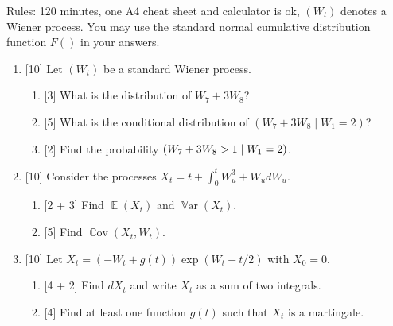 \documentclass[12pt]{article}
\DeclareMathOperator{\Cov}{\mathbb{C}ov}
\DeclareMathOperator{\Var}{\mathbb{V}ar}
\let\P\relax
\DeclareMathOperator{\P}{\mathbb{P}}
\DeclareMathOperator{\E}{\mathbb{E}}
\begin{document}
Rules: 120 minutes, one A4 cheat sheet and calculator is ok, $(W_t)$ denotes a Wiener process.
You may use the standard normal cumulative distribution function $F()$ in your answers.

\begin{enumerate}
    \item {[10]} Let $(W_t)$ be a standard Wiener process. 
    \begin{enumerate}
        \item {[3]} What is the distribution of $W_7 + 3W_8$? 
        \item {[5]} What is the conditional distribution of $(W_7 + 3W_8 \mid W_1 = 2)$?
        \item {[2]} Find the probability $\P(W_7 + 3W_8 > 1 \mid W_1 = 2)$.
    \end{enumerate}


    \item {[10]} Consider the processes $X_t = t + \int_0^t W_u^3 + W_u dW_u$.
    \begin{enumerate}
        \item {[2 + 3]} Find $\E(X_t)$ and $\Var(X_t)$.
        \item {[5]} Find $\Cov(X_t, W_t)$.
    \end{enumerate}




    \item {[10]} Let $X_t = (- W_t + g(t))\exp(W_t - t/2)$ with $X_0 = 0$.
    \begin{enumerate}
        \item {[4 + 2]} Find $dX_t$ and write $X_t$ as a sum of two integrals.
        \item {[4]} Find at least one function $g(t)$ such that $X_t$ is a martingale.
    \end{enumerate}


\end{enumerate}
\end{document}
